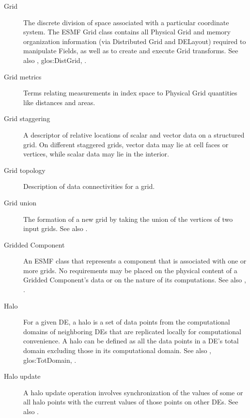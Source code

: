 \begin{description}
\label{glos:Grid} 
\item[Grid] 
  The discrete division of space associated with
  a particular coordinate system.  The ESMF Grid class contains all 
  Physical Grid and memory 
  organization information (via Distributed Grid and DELayout) required 
  to manipulate 
  Fields, as well as to create and execute Grid transforms. 
  See also , 
  {glos:DistGrid}, .

\label{glos:GridMetrics} 
\item[Grid metrics] 
  Terms relating measurements 
  in index space to Physical Grid quantities like distances and areas.

\label{glos:GridStagger} 
\item[Grid staggering] 
  A descriptor of relative locations
  of scalar and vector data on a structured grid. On different
  staggered grids, vector data may lie at cell faces or vertices,
  while scalar data may lie in the interior. 

\label{glos:GridTopo} 
\item[Grid topology] 
  Description of data connectivities for a grid.

\label{glos:GridUnion} 
\item[Grid union] 
  The formation of a new grid
  by taking the union of the vertices of two input grids.
  See also . 

\label{glos:GridComp}
\item[Gridded Component] 
  An ESMF class that represents a component that is associated with one 
  or more grids.  No requirements 
  may be placed on the physical content of a Gridded Component's data or 
  on the nature of its computations. See also ,
  . 

\label{glos:Halo} 
\item[Halo] 
  For a given DE, a halo is a set of data points from the computational 
  domains of neighboring DEs that are replicated locally for computational
  convenience.  A halo can be defined as all the data points 
  in a DE's total domain excluding those in its computational domain. 
  See also , 
  {glos:TotDomain}, .

\label{glos:HaloUpdate}
\item[Halo update] 
  A halo update operation involves synchronization of the values of some 
  or all halo points with the current values of those points on other DEs.
  See also .


\end{description}
